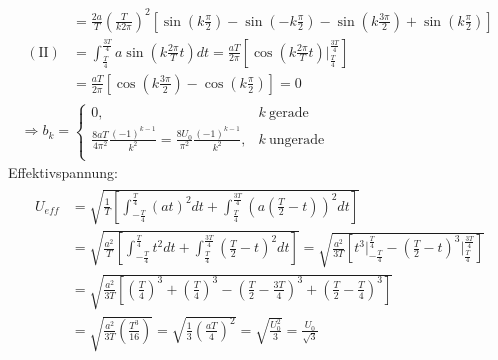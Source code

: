 \begin{gather}
\begin{aligned}
            &= \frac{2a}{T}\left(\frac{T}{k2\pi}\right)^2 \left[\sin(k\frac{\pi}{2}) - \sin(-k\frac{\pi}{2}) - \sin(k\frac{3\pi}{2}) + \sin(k\frac{\pi}{2})\right]\\[0,5cm]
        (\text{II}) &= \int^{\frac{3T}{4}}_{\frac{T}{4}}a\sin(k \frac{2\pi}{T} t)dt = \frac{aT}{2\pi} \left[\cos(k\frac{2\pi}{T}t)\bigg \vert^{\frac{3T}{4}}_{\frac{T}{4}}\right]\\
                    &= \frac{aT}{2\pi} \left[\cos(k\frac{3\pi}{2}) - \cos(k\frac{\pi}{2})\right] = 0
    \end{aligned}\\[0,5cm]
    \Rightarrow b_k =
    \begin{cases}
        0, & k~\text{gerade}\\
        \frac{8aT}{4\pi^2}\frac{(-1)^{k-1}}{k^2} = \frac{8U_0}{\pi^2}\frac{(-1)^{k-1}}{k^2}, & k~\text{ungerade}\\
    \end{cases}
\end{gather}
Effektivspannung:
\begin{gather}
    \begin{aligned}
        U_{eff} &= \sqrt{\frac{1}{T}\left[\int^{\frac{T}{4}}_{-\frac{T}{4}} (at)^2dt + \int^{\frac{3T}{4}}_{\frac{T}{4}} \left(a\left(\frac{T}{2}-t\right)\right)^2 dt\right]}\\
                &= \sqrt{\frac{a^2}{T}\left[\int^{\frac{T}{4}}_{-\frac{T}{4}} t^2dt + \int^{\frac{3T}{4}}_{\frac{T}{4}} \left(\frac{T}{2}-t\right)^2 dt\right]}
                = \sqrt{\frac{a^2}{3T}\left[t^3 \bigg \vert^{\frac{T}{4}}_{-\frac{T}{4}} - \left(\frac{T}{2}-t\right)^3 \bigg \vert^{\frac{3T}{4}}_{\frac{T}{4}}\right]}\\
                &= \sqrt{\frac{a^2}{3T}\left[\left(\frac{T}{4}\right)^3 + \left(\frac{T}{4}\right)^3 - \left(\frac{T}{2}- \frac{3T}{4} \right)^3 +  \left(\frac{T}{2}- \frac{T}{4} \right)^3\right]}\\
                &= \sqrt{\frac{a^2}{3T}\left(\frac{T^3}{16}\right)} = \sqrt{\frac{1}{3}\left(\frac{aT}{4}\right)^2} = \sqrt{\frac{U_0^2}{3}} = \frac{U_0}{\sqrt{3}}
     \end{aligned}
\end{gather}
